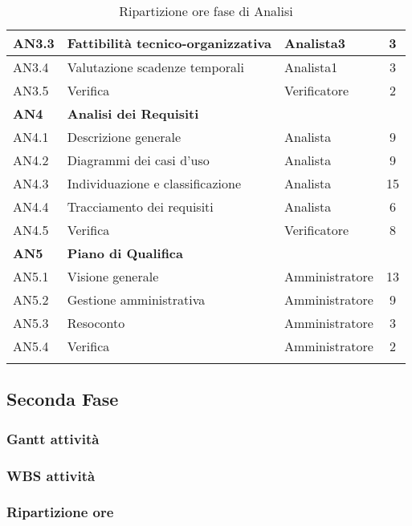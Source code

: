 \begin{longtable}{|l|l|l|c|}
      	\hline
      	{AN3.3} & {Fattibilità tecnico-organizzativa} & Analista3  & 3 \\
      	\hline
      	{AN3.4} & {Valutazione scadenze temporali} & Analista1  & 3 \\
      	\hline
      	{AN3.5} & {Verifica} & Verificatore  & 2 \\
      \hline
      \textbf{AN4} & \textbf{Analisi dei Requisiti} & &  \\
         \hline
         {AN4.1} & {Descrizione generale} & Analista  &  9\\
         \hline
         {AN4.2} & {Diagrammi dei casi d'uso} & Analista  &  9\\
         \hline
         {AN4.3} & {Individuazione e classificazione} & Analista  &  15\\
         \hline
         {AN4.4} & {Tracciamento dei requisiti} & Analista  &  6\\
         \hline
         {AN4.5} & {Verifica} & Verificatore  &  8\\
     \hline
     \textbf{AN5} & \textbf{Piano di Qualifica} & &  \\
         \hline
         {AN5.1} & {Visione generale} & Amministratore &  13 \\
         \hline
         {AN5.2} & {Gestione amministrativa} & Amministratore  &  9\\
         \hline
         {AN5.3} & {Resoconto} & Amministratore &  3\\
         \hline
         {AN5.4} & {Verifica} & Amministratore &  2 \\
     \hline
     \caption{Ripartizione ore fase di Analisi}
\end{longtable}
\egroup
  



\subsection{Seconda Fase}
\subsubsection{Gantt attività}

\subsubsection{WBS attività}

\subsubsection{Ripartizione ore}

